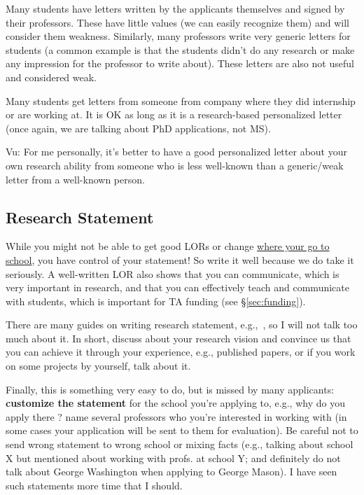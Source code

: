 \documentclass[10pt]{article}
\begin{document}
Many students have letters written by the applicants themselves and signed by their professors. These have little
values (we can easily recognize them) and will consider them weakness.
Similarly, many professors write very generic letters for students (a common example is that the students didn't do any
research or make any impression for the professor to write about). These
letters are also not useful and considered weak.

Many students get letters from someone from company where they did internship or are
working at. It is OK as long as it is a research-based personalized
letter (once again, we are talking about PhD applications, not MS).


\begin{tcolorbox}[left=1pt,right=1pt,top=1pt,bottom=1pt]
Vu: For me personally, it's better to have a good personalized
letter about your own research ability from someone who is less
well-known than a generic/weak letter from a well-known person.
\end{tcolorbox}

\subsection{Research Statement}\label{sec:research-statement}

While you might not be able to get good LORs or change
\hyperref[sec:your-school]{where your go to school}, you have control of your
statement! So write it well because we do take it seriously.
A well-written LOR also shows that you can communicate, which is very important in research, and that you can effectively teach and communicate with students, which is important for TA funding (see \S\ref{sec:funding}).

There are many guides on writing research statement, e.g.,~\cite{blattman2022writing},
so I will not talk too much about it. In short, discuss about your research vision and convince us that you can achieve it through your experience, e.g., published papers, or if you work on some projects by yourself, talk about it.

Finally, this is something very easy to do, but is missed by many
applicants: \textbf{customize the statement} for the school you're applying to,
e.g., why do you apply there ? name several professors who you're
interested in working with (in some cases your application will be sent to them for evaluation).
Be careful not to send wrong statement to wrong school or mixing
facts (e.g., talking about school X but mentioned about working with
profs. at school Y; and definitely do not talk about George Washington when applying to George Mason). I have seen such statements more time that I
should.
\end{document}

